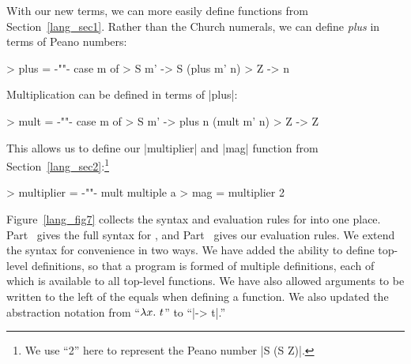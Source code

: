 \documentclass[12pt]{report}
\begin{document}
With our new terms, we can more easily define functions from
Section~\ref{lang_sec1}. Rather than the Church numerals,
we can define \emph{plus} in terms of Peano numbers:

> plus = {-""-} case m of
>   S m' -> S (plus m' n)
>   Z -> n

Multiplication can be defined in terms of |plus|:

> mult = {-""-} case m of
>   S m' -> plus n (mult m' n)
>   Z -> Z

This allows us to define our |multiplier| and |mag| function from
Section~\ref{lang_sec2}:\footnote{We use ``2'' here to represent the
  Peano number |S (S Z)|.}

> multiplier = {-""-} mult multiple a
> mag = multiplier 2

Figure~\ref{lang_fig7} collects the syntax and evaluation rules for
\lamC into one place. Part~ gives the full
syntax for \lamC, and Part~ gives our
evaluation rules. We extend the syntax for convenience in two ways. We
have added the ability to define top-level definitions, so that a
program is formed of multiple definitions, each of which is available
to all top-level functions. We have also allowed arguments to be
written to the left of the equals when defining a function.  We also
updated the abstraction notation from ``$\lambda x.\ t$'' to ``|\x ->
t|.''

\afterpage{\clearpage\clearpage}




\end{document}
